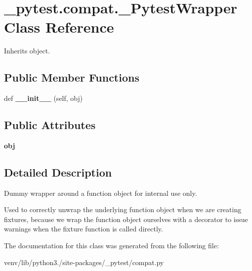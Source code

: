 \hypertarget{class__pytest_1_1compat_1_1___pytest_wrapper}{}\section{\+\_\+pytest.\+compat.\+\_\+\+Pytest\+Wrapper Class Reference}
\label{class__pytest_1_1compat_1_1___pytest_wrapper}


Inherits object.

\subsection*{Public Member Functions}
\begin{DoxyCompactItemize}
\item 
\mbox{\label{class__pytest_1_1compat_1_1___pytest_wrapper_aadbc0c6bb7de35b35950869d79c5b881}} 
def {\bfseries \+\_\+\+\_\+init\+\_\+\+\_\+} (self, obj)
\end{DoxyCompactItemize}
\subsection*{Public Attributes}
\begin{DoxyCompactItemize}
\item 
\mbox{\label{class__pytest_1_1compat_1_1___pytest_wrapper_a4aaa55113eaf0f65b3ea27702dc1abb7}} 
{\bfseries obj}
\end{DoxyCompactItemize}


\subsection{Detailed Description}
\begin{DoxyVerb}Dummy wrapper around a function object for internal use only.

Used to correctly unwrap the underlying function object
when we are creating fixtures, because we wrap the function object ourselves with a decorator
to issue warnings when the fixture function is called directly.
\end{DoxyVerb}
 

The documentation for this class was generated from the following file\+:\begin{DoxyCompactItemize}
\item 
venv/lib/python3./site-\/packages/\+\_\+pytest/compat.\+py\end{DoxyCompactItemize}
